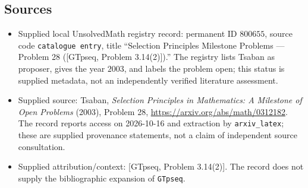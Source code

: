 \documentclass[11pt]{article}
\begin{document}
\subsection{Sources}
\begin{itemize}
\item Supplied local UnsolvedMath registry record: permanent ID \(800655\), source code \texttt{catalogue entry}, title ``Selection Principles Milestone Problems --- Problem 28 ([GTpseq, Problem 3.14(2)]).'' The registry lists Tsaban as proposer, gives the year \(2003\), and labels the problem open; this status is supplied metadata, not an independently verified literature assessment.
\item Supplied source: Tsaban, \emph{Selection Principles in Mathematics: A Milestone of Open Problems} (2003), Problem 28, \url{https://arxiv.org/abs/math/0312182}. The record reports access on 2026-10-16 and extraction by \texttt{arxiv\_latex}; these are supplied provenance statements, not a claim of independent source consultation.
\item Supplied attribution/context: [GTpseq, Problem 3.14(2)]. The record does not supply the bibliographic expansion of \texttt{GTpseq}.
\end{itemize}
\end{document}
